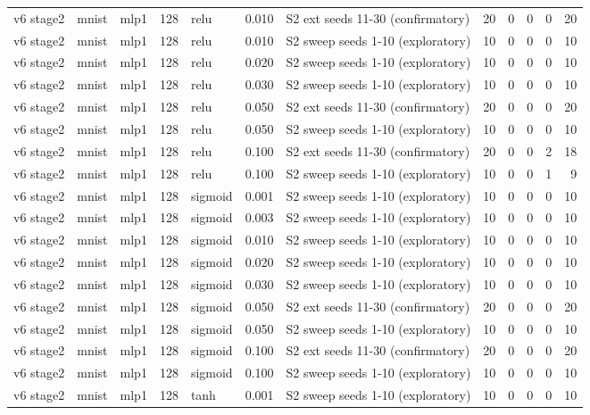 \begin{table}[htbp]
{\begin{tabular}{@{}lllrlrlrrrrr@{}}
v6 stage2 & mnist & mlp1 & 128 & relu & 0.010 & S2 ext seeds 11-30 (confirmatory) & 20 & 0 & 0 & 0 & 20 \\
v6 stage2 & mnist & mlp1 & 128 & relu & 0.010 & S2 sweep seeds 1-10 (exploratory) & 10 & 0 & 0 & 0 & 10 \\
v6 stage2 & mnist & mlp1 & 128 & relu & 0.020 & S2 sweep seeds 1-10 (exploratory) & 10 & 0 & 0 & 0 & 10 \\
v6 stage2 & mnist & mlp1 & 128 & relu & 0.030 & S2 sweep seeds 1-10 (exploratory) & 10 & 0 & 0 & 0 & 10 \\
v6 stage2 & mnist & mlp1 & 128 & relu & 0.050 & S2 ext seeds 11-30 (confirmatory) & 20 & 0 & 0 & 0 & 20 \\
v6 stage2 & mnist & mlp1 & 128 & relu & 0.050 & S2 sweep seeds 1-10 (exploratory) & 10 & 0 & 0 & 0 & 10 \\
v6 stage2 & mnist & mlp1 & 128 & relu & 0.100 & S2 ext seeds 11-30 (confirmatory) & 20 & 0 & 0 & 2 & 18 \\
v6 stage2 & mnist & mlp1 & 128 & relu & 0.100 & S2 sweep seeds 1-10 (exploratory) & 10 & 0 & 0 & 1 & 9 \\
v6 stage2 & mnist & mlp1 & 128 & sigmoid & 0.001 & S2 sweep seeds 1-10 (exploratory) & 10 & 0 & 0 & 0 & 10 \\
v6 stage2 & mnist & mlp1 & 128 & sigmoid & 0.003 & S2 sweep seeds 1-10 (exploratory) & 10 & 0 & 0 & 0 & 10 \\
v6 stage2 & mnist & mlp1 & 128 & sigmoid & 0.010 & S2 sweep seeds 1-10 (exploratory) & 10 & 0 & 0 & 0 & 10 \\
v6 stage2 & mnist & mlp1 & 128 & sigmoid & 0.020 & S2 sweep seeds 1-10 (exploratory) & 10 & 0 & 0 & 0 & 10 \\
v6 stage2 & mnist & mlp1 & 128 & sigmoid & 0.030 & S2 sweep seeds 1-10 (exploratory) & 10 & 0 & 0 & 0 & 10 \\
v6 stage2 & mnist & mlp1 & 128 & sigmoid & 0.050 & S2 ext seeds 11-30 (confirmatory) & 20 & 0 & 0 & 0 & 20 \\
v6 stage2 & mnist & mlp1 & 128 & sigmoid & 0.050 & S2 sweep seeds 1-10 (exploratory) & 10 & 0 & 0 & 0 & 10 \\
v6 stage2 & mnist & mlp1 & 128 & sigmoid & 0.100 & S2 ext seeds 11-30 (confirmatory) & 20 & 0 & 0 & 0 & 20 \\
v6 stage2 & mnist & mlp1 & 128 & sigmoid & 0.100 & S2 sweep seeds 1-10 (exploratory) & 10 & 0 & 0 & 0 & 10 \\
v6 stage2 & mnist & mlp1 & 128 & tanh & 0.001 & S2 sweep seeds 1-10 (exploratory) & 10 & 0 & 0 & 0 & 10 \\

\end{tabular}}
\end{table}
